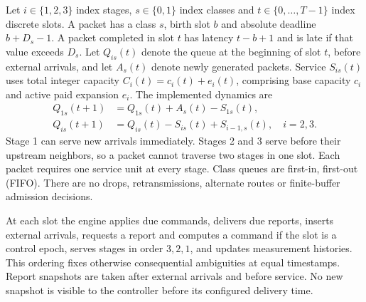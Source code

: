 \documentclass{IEEEoj}
\begin{document}
Let $i\in\{1,2,3\}$ index stages, $s\in\{0,1\}$ index classes and
$t\in\{0,\ldots,T-1\}$ index discrete slots. A packet has a class $s$, birth
slot $b$ and absolute deadline $b+D_s-1$. A packet completed in slot $t$ has
latency $t-b+1$ and is late if that value exceeds $D_s$.
Let $Q_{is}(t)$ denote the queue at the beginning of slot $t$, before external
arrivals, and let $A_s(t)$ denote newly generated packets. Service $S_{is}(t)$
uses total integer capacity $C_i(t)=c_i(t)+e_i(t)$, comprising base capacity
$c_i$ and active paid expansion $e_i$. The implemented dynamics are
\begin{align}
 Q_{1s}(t+1)&=Q_{1s}(t)+A_s(t)-S_{1s}(t),\label{eq:q1}\\
 Q_{is}(t+1)&=Q_{is}(t)-S_{is}(t)+S_{i-1,s}(t),\quad i=2,3.\label{eq:qi}
\end{align}
Stage 1 can serve new arrivals immediately. Stages 2 and 3 serve before their
upstream neighbors, so a packet cannot traverse two stages in one slot.
Each packet requires one service unit at every stage. Class queues are first-in,
first-out (FIFO). There are no drops, retransmissions, alternate routes or
finite-buffer admission decisions.

At each slot the engine applies due commands, delivers due reports, inserts
external arrivals, requests a report and computes a command if the slot is a
control epoch, serves stages in order $3,2,1$, and updates measurement histories.
This ordering fixes otherwise consequential ambiguities at equal timestamps.
Report snapshots are taken after external arrivals and before service.
No new snapshot is visible to the controller before its configured delivery time.
\end{document}
